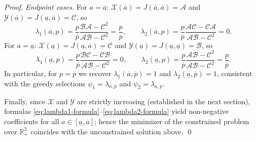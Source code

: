 \documentclass[10pt,a4paper]{amsart}
\begin{document}
\begin{proof}
\medskip\noindent
\emph{Endpoint cases.}
For $a=\overline{a}$: $\mathcal{X}(\overline{a})=J(\overline{a},\overline{a})=\mathcal{A}$
and $\mathcal{Y}(\overline{a})=J(\underline{a},\overline{a})=\mathcal{C}$, so
\[
\lambda_1(\overline{a},p)
=\frac{p}{\overline{p}}\frac{\mathcal{B}\mathcal{A}-\mathcal{C}^2}
                            {\mathcal{A}\mathcal{B}-\mathcal{C}^2}
=\frac{p}{\overline{p}},
\qquad
\lambda_2(\overline{a},p)
=\frac{p}{\overline{p}}\frac{\mathcal{A}\mathcal{C}-\mathcal{C}\mathcal{A}}
                            {\mathcal{A}\mathcal{B}-\mathcal{C}^2}=0.
\]
For $a=\underline{a}$: $\mathcal{X}(\underline{a})=J(\underline{a},\overline{a})=\mathcal{C}$
and $\mathcal{Y}(\underline{a})=J(\underline{a},\underline{a})=\mathcal{B}$, so
\[
\lambda_1(\underline{a},p)
=\frac{p}{\overline{p}}\frac{\mathcal{B}\mathcal{C}-\mathcal{C}\mathcal{B}}
                            {\mathcal{A}\mathcal{B}-\mathcal{C}^2}=0,
\qquad
\lambda_2(\underline{a},p)
=\frac{p}{\overline{p}}\frac{\mathcal{A}\mathcal{B}-\mathcal{C}^2}
                            {\mathcal{A}\mathcal{B}-\mathcal{C}^2}=\frac{p}{\overline{p}}.
\]
In particular, for $p=\overline{p}$ we recover $\lambda_1(\overline{a},\overline{p})=1$
and $\lambda_2(\underline{a},\overline{p})=1$, consistent with the greedy
selections $\psi_1=\lambda_{\overline{a},\overline{p}}$ and
$\psi_2=\lambda_{\underline{a},\overline{p}}$.

\medskip\noindent
Finally, since $\mathcal{X}$ and $\mathcal{Y}$ are strictly increasing (established
in the next section), formulas \eqref{eq:lambda1-formula}--\eqref{eq:lambda2-formula}
yield non-negative coefficients for all $a\in[\underline{a},\overline{a}]$; hence
the minimizer of the constrained problem over $\mathbb{R}_+^2$ coincides with the
unconstrained solution above.
\qed
\end{proof}
\end{document}
